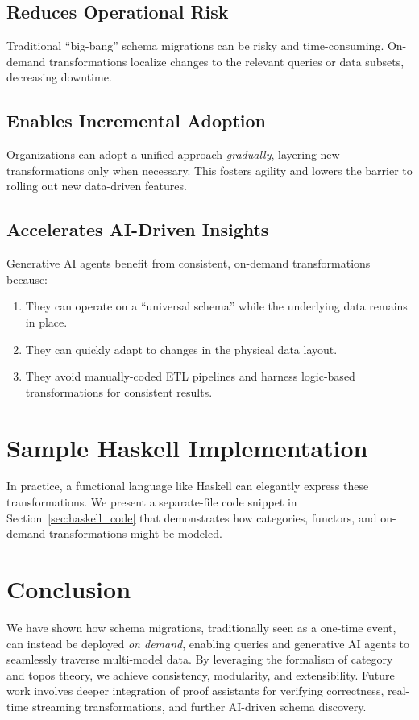 \documentclass[11pt]{article}
\begin{document}
\subsection{Reduces Operational Risk}
Traditional “big-bang” schema migrations can be risky and time-consuming. On-demand transformations localize changes to the relevant queries or data subsets, decreasing downtime.

\subsection{Enables Incremental Adoption}
Organizations can adopt a unified approach \emph{gradually}, layering new transformations only when necessary. This fosters agility and lowers the barrier to rolling out new data-driven features.

\subsection{Accelerates AI-Driven Insights}
Generative AI agents benefit from consistent, on-demand transformations because:
\begin{enumerate}
    \item They can operate on a “universal schema” while the underlying data remains in place.
    \item They can quickly adapt to changes in the physical data layout.
    \item They avoid manually-coded ETL pipelines and harness logic-based transformations for consistent results.
\end{enumerate}

\section{Sample Haskell Implementation}
In practice, a functional language like Haskell can elegantly express these transformations. We present a separate-file code snippet in Section~\ref{sec:haskell_code} that demonstrates how categories, functors, and on-demand transformations might be modeled.

\section{Conclusion}
We have shown how schema migrations, traditionally seen as a one-time event, can instead be deployed \emph{on demand}, enabling queries and generative AI agents to seamlessly traverse multi-model data. By leveraging the formalism of category and topos theory, we achieve consistency, modularity, and extensibility. Future work involves deeper integration of proof assistants for verifying correctness, real-time streaming transformations, and further AI-driven schema discovery.
\end{document}
